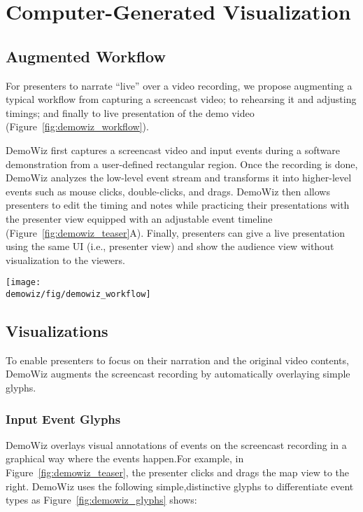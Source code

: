 \section{Computer-Generated Visualization}

\subsection{Augmented Workflow}
For presenters to narrate ``live'' over a video recording, we propose augmenting a typical workflow from capturing a screencast video; to rehearsing it and adjusting timings; and finally to live presentation of the demo video (Figure~\ref{fig:demowiz_workflow}).

DemoWiz first captures a screencast video and input events during a software demonstration from a user-defined rectangular region. Once the recording is done, DemoWiz analyzes the low-level event stream and transforms it into higher-level events such as mouse clicks, double-clicks, and drags. DemoWiz then allows presenters to edit the timing and notes while practicing their presentations with the presenter view equipped with an adjustable event timeline (Figure~\ref{fig:demowiz_teaser}A). Finally, presenters can give a live presentation using the same UI (i.e., presenter view) and show the audience view without visualization to the viewers.

\begin{figure*}[t]
  \centering
  \texttt{[image: \\demowiz/fig/demowiz\_workflow]}
  \caption{DemoWiz workflow: Presenters capture a software demonstration, edit the video recording while rehearsing with our playback UI, and present the edited video to the audience using a presenter view.}
  \label{fig:demowiz_workflow}
\end{figure*}


\subsection{Visualizations}
To enable presenters to focus on their narration and the original video contents, DemoWiz augments the screencast recording by automatically overlaying simple glyphs.

\subsubsection{Input Event Glyphs}
DemoWiz overlays visual annotations of events on the screencast recording in a graphical way where the events happen.For example, in Figure~\ref{fig:demowiz_teaser}, the presenter clicks and drags the map view to the right. DemoWiz uses the following simple,distinctive glyphs to differentiate event types as Figure~\ref{fig:demowiz_glyphs} shows:

